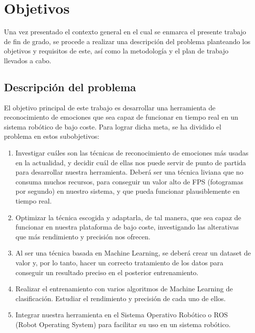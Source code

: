 \chapter{Objetivos}
\label{cap:capitulo2}

Una vez presentado el contexto general en el cual se enmarca el presente trabajo de fin de grado, se procede a realizar una descripción del problema planteando los objetivos y requisitos de este, así como la metodología y el plan de trabajo llevados a cabo.

\section{Descripción del problema}
\label{sec:descripcion}

El objetivo principal de este trabajo es desarrollar una herramienta de reconocimiento de emociones que sea capaz de funcionar en tiempo real en un sistema robótico de bajo coste. Para lograr dicha meta, se ha dividido el problema en estos subobjetivos:
\begin{enumerate}
    \item Investigar cuáles son las técnicas de reconocimiento de emociones más usadas en la actualidad, y decidir cuál de ellas nos puede servir de punto de partida para desarrollar nuestra herramienta. Deberá ser una técnica liviana que no consuma muchos recursos, para conseguir un valor alto de FPS (fotogramas por segundo) en nuestro sistema, y que pueda funcionar plausiblemente en tiempo real.
    
    \item Optimizar la técnica escogida y adaptarla, de tal manera, que sea capaz de funcionar en nuestra plataforma de bajo coste, investigando las alterativas que más rendimiento y precisión nos ofrecen.
    
    \item Al ser una técnica basada en Machine Learning, se deberá crear un dataset de valor y, por lo tanto, hacer un correcto tratamiento de los datos para conseguir un resultado preciso en el posterior entrenamiento.
    
    \item Realizar el entrenamiento con varios algoritmos de Machine Learning de clasificación. Estudiar el rendimiento y precisión de cada uno de ellos.
    
    \item Integrar nuestra herramienta en el Sistema Operativo Robótico o ROS (Robot Operating System) para facilitar su uso en un sistema robótico.
\end{enumerate}

